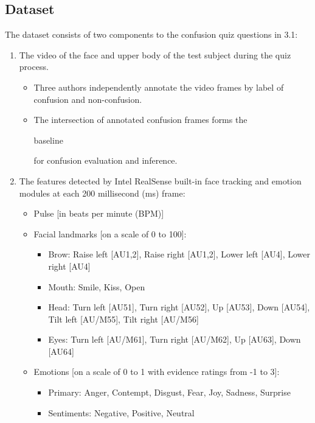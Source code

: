 \documentclass[12pt,letterpaper]{article}
\begin{document}
\subsection{Dataset}

The dataset consists of two components to the confusion quiz questions in 3.1: 
\begin{enumerate}
\item The video of the face and upper body of the test subject during the quiz process.
\begin{itemize}
\item Three authors independently annotate the video frames by label of confusion and non-confusion. 
\item The intersection of annotated confusion frames forms the \begin{bf}baseline\end{bf} for confusion evaluation and inference.
\end{itemize}

\item The features detected by Intel RealSense built-in face tracking and emotion modules at each 200 millisecond (ms) frame:
\begin{itemize}
\item Pulse [in beats per minute (BPM)]
\item Facial landmarks [on a scale of 0 to 100]: 
\begin{itemize}
\item Brow: Raise left [AU1,2], Raise right [AU1,2], Lower left [AU4], Lower right [AU4]
\item Mouth: Smile, Kiss, Open
\item Head: Turn left [AU51], Turn right [AU52], Up [AU53], Down [AU54], Tilt left [AU/M55], Tilt right [AU/M56]
\item Eyes: Turn left [AU/M61], Turn right [AU/M62], Up [AU63], Down [AU64]
\end{itemize}

\item Emotions [on a scale of 0 to 1 with evidence ratings from -1 to 3]: 
\begin{itemize}
\item Primary: Anger, Contempt, Disgust, Fear, Joy, Sadness, Surprise
\item Sentiments: Negative, Positive, Neutral
\end{itemize}
\end{itemize}
\end{enumerate}
\end{document}
